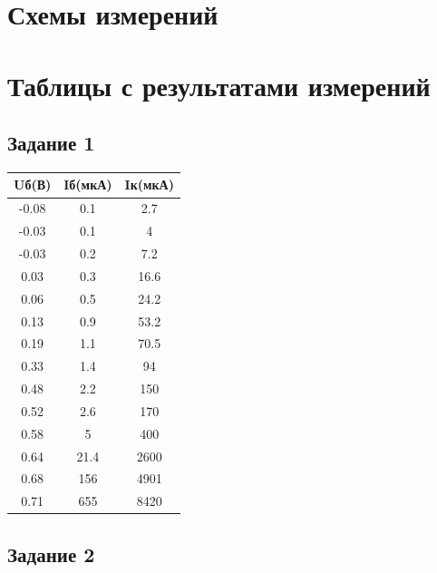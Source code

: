 \documentclass[a4paper,14pt]{article}
\begin{document}
\pagebreak

\section{Схемы измерений}

\section{Таблицы с результатами измерений}
\subsection{ Задание 1}
\begin{table}[H]
	\begin{tabular}{|c|c|c|}
		\hline
		Uб(В) & Iб(мкА) & Iк(мкА) \\ \hline
		-0.08 & 0.1     & 2.7     \\ \hline
		-0.03 & 0.1     & 4       \\ \hline
		-0.03 & 0.2     & 7.2     \\ \hline
		0.03  & 0.3     & 16.6    \\ \hline
		0.06  & 0.5     & 24.2    \\ \hline
		0.13  & 0.9     & 53.2    \\ \hline
		0.19  & 1.1     & 70.5    \\ \hline
		0.33  & 1.4     & 94      \\ \hline
		0.48  & 2.2     & 150     \\ \hline
		0.52  & 2.6     & 170     \\ \hline
		0.58  & 5       & 400     \\ \hline
		0.64  & 21.4    & 2600    \\ \hline
		0.68  & 156     & 4901    \\ \hline
		0.71  & 655     & 8420    \\ \hline
	\end{tabular}
\end{table}


\subsection{ Задание 2}
\end{document}
